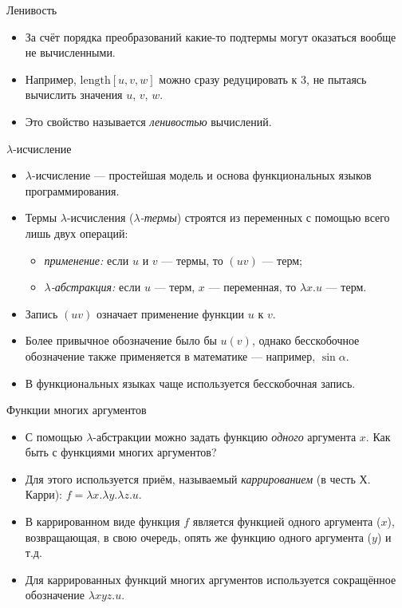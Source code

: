 \documentclass[xcolor=dvipsnames]{beamer}
\begin{document}
\begin{frame}{Ленивость}

\begin{itemize}[<+->]
 \item За счёт порядка преобразований какие-то подтермы могут оказаться вообще не вычисленными.
 \item Например, $\mathrm{length} [ u,v,w ]$ можно сразу редуцировать к $3$, не пытаясь вычислить значения $u$, $v$, $w$.
\item Это свойство называется {\em ленивостью} вычислений.
 \end{itemize}

 
\end{frame}


\begin{frame}{$\lambda$-исчисление}

\begin{itemize}
 \item $\lambda$-исчисление --- простейшая модель и основа функциональных языков программирования.
 \item<2-> Термы $\lambda$-исчисления ({\em $\lambda$-термы}) строятся из переменных с помощью всего лишь двух операций:
 \begin{itemize}
 \item {\em применение:} если $u$ и $v$ --- термы, то $(uv)$ --- терм;
 \item {\em $\lambda$-абстракция:} 
 если $u$ --- терм, $x$ --- переменная, то
 $\lambda x . u$ --- терм.
 \end{itemize}
 \item<3-> Запись $(uv)$ означает применение функции $u$ к  $v$. 
 \item<4-> Более привычное обозначение было бы $u(v)$, однако бесскобочное обозначение также применяется в математике --- например, $\sin \alpha$.
 \item<5-> В функциональных языках чаще используется бесскобочная запись.
\end{itemize}

 
\end{frame}

\begin{frame}{Функции многих аргументов}

\begin{itemize}[<+->]
 \item С помощью $\lambda$-абстракции можно задать функцию {\em одного} аргумента $x$. Как быть с функциями многих аргументов?
 \item Для этого используется приём, называемый {\em каррированием} (в честь Х.\,Карри): $f = \lambda x. \lambda y.\lambda z. u$.
 \item В каррированном виде функция $f$ является функцией одного аргумента ($x$), возвращающая, в свою очередь, опять же функцию одного аргумента ($y$) и т.д.
 \item Для каррированных функций многих аргументов используется сокращённое обозначение $\lambda xyz. u$.
\end{itemize}

 
\end{frame}
\end{document}
